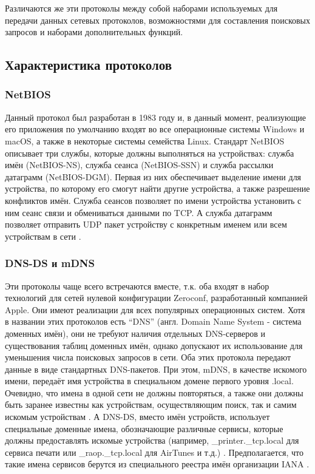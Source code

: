 
Различаются же эти протоколы между собой наборами используемых для передачи данных сетевых протоколов, возможностями для составления поисковых запросов и наборами дополнительных функций.

\subsection{Характеристика протоколов}

\subsubsection{NetBIOS}
Данный протокол был разработан в 1983 году и, в данный момент, реализующие его приложения по умолчанию входят во все операционные системы Windows и macOS, а также в некоторые системы семейства Linux.
Стандарт NetBIOS описывает три службы, которые должны выполняться на устройствах: служба имён (NetBIOS-NS), служба сеанса (NetBIOS-SSN) и служба рассылки датаграмм (NetBIOS-DGM).
Первая из них обеспечивает выделение имени для устройства, по которому его смогут найти другие устройства, а также разрешение конфликтов имён.
Служба сеансов позволяет по имени устройства установить с ним сеанс связи и обмениваться данными по TCP.
А служба датаграмм позволяет отправить UDP пакет устройству с конкретным именем или всем устройствам в сети \cite{ref12}.

\subsubsection{DNS-DS и mDNS}
Эти протоколы чаще всего встречаются вместе, т.к. оба входят в набор технологий для сетей нулевой конфигурации Zeroconf, разработанный компанией Apple.
Они имеют реализации для всех популярных операционных систем.
Хотя в названии этих протоколов есть "`DNS"' (англ. Domain Name System - система доменных имён), они не требуют наличия отдельных DNS-серверов и существования таблиц доменных имён, однако допускают их использование для уменьшения числа поисковых запросов в сети.
Оба этих протокола передают данные в виде стандартных DNS-пакетов.
При этом, mDNS, в качестве искомого имени, передаёт имя устройства в специальном домене первого уровня .local.
Очевидно, что имена в одной сети не должны повторяться, а также они должны быть заранее известны как устройствам, осуществляющим поиск, так и самим искомым устройствам \cite{ref15,ref16}.
А DNS-DS, вместо имён устройств, использует специальные доменные имена, обозначающие различные сервисы, которые должны предоставлять искомые устройства (например, {\_}printer.{\_}tcp.local для сервиса печати или {\_}raop.{\_}tcp.local для AirTunes и т.д.) \cite{ref13,ref18}.
Предполагается, что такие имена сервисов берутся из специального реестра имён организации IANA \cite{ref17}.

